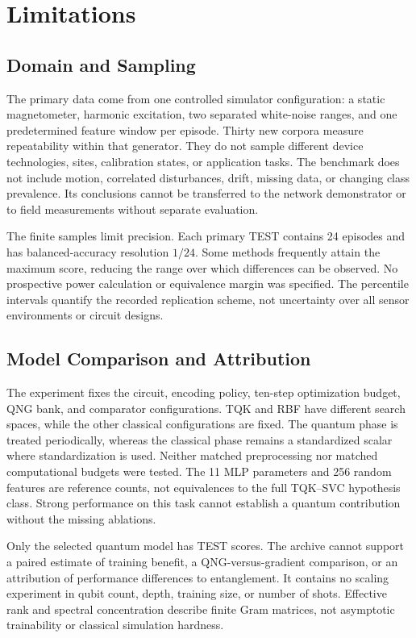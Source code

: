 \section{Limitations}
\label{sec:limitations}

\subsection{Domain and Sampling}

The primary data come from one controlled simulator configuration: a static magnetometer, harmonic excitation, two separated white-noise ranges, and one predetermined feature window per episode. Thirty new corpora measure repeatability within that generator. They do not sample different device technologies, sites, calibration states, or application tasks. The benchmark does not include motion, correlated disturbances, drift, missing data, or changing class prevalence. Its conclusions cannot be transferred to the network demonstrator or to field measurements without separate evaluation.

The finite samples limit precision. Each primary TEST contains 24 episodes and has balanced-accuracy resolution $1/24$. Some methods frequently attain the maximum score, reducing the range over which differences can be observed. No prospective power calculation or equivalence margin was specified. The percentile intervals quantify the recorded replication scheme, not uncertainty over all sensor environments or circuit designs.

\subsection{Model Comparison and Attribution}

The experiment fixes the circuit, encoding policy, ten-step optimization budget, QNG bank, and comparator configurations. TQK and RBF have different search spaces, while the other classical configurations are fixed. The quantum phase is treated periodically, whereas the classical phase remains a standardized scalar where standardization is used. Neither matched preprocessing nor matched computational budgets were tested. The 11 MLP parameters and 256 random features are reference counts, not equivalences to the full TQK--SVC hypothesis class. Strong performance on this task cannot establish a quantum contribution without the missing ablations.

Only the selected quantum model has TEST scores. The archive cannot support a paired estimate of training benefit, a QNG-versus-gradient comparison, or an attribution of performance differences to entanglement. It contains no scaling experiment in qubit count, depth, training size, or number of shots. Effective rank and spectral concentration describe finite Gram matrices, not asymptotic trainability or classical simulation hardness.


